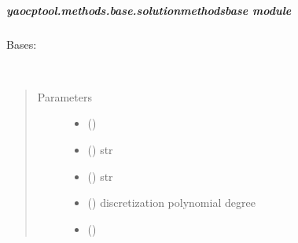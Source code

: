 \documentclass[letterpaper,10pt,english]{sphinxmanual}
\begin{document}
\subparagraph{yaocptool.methods.base.solutionmethodsbase module}
\label{\detokenize{yaocptool.methods.base:module-yaocptool.methods.base.solutionmethodsbase}}\label{\detokenize{yaocptool.methods.base:yaocptool-methods-base-solutionmethodsbase-module}}

\begin{fulllineitems}
\label{\detokenize{yaocptool.methods.base:yaocptool.methods.base.solutionmethodsbase.SolutionMethodsBase}}
Bases: 

\begin{fulllineitems}
\label{\detokenize{yaocptool.methods.base:yaocptool.methods.base.solutionmethodsbase.SolutionMethodsBase.__init__}}~\begin{quote}\begin{description}
\item[{Parameters}] \leavevmode\begin{itemize}
\item {} 
 ({\hyperref[\detokenize{yaocptool.modelling:yaocptool.modelling.ocp.OptimalControlProblem}]{}}) \textendash{} 

\item {} 
 () \textendash{} str

\item {} 
 () \textendash{} str

\item {} 
 () \textendash{} discretization polynomial degree

\item {} 
 () \textendash{} 


\end{itemize}
\end{description}
\end{quote}
\end{fulllineitems}
\end{fulllineitems}
\end{document}
